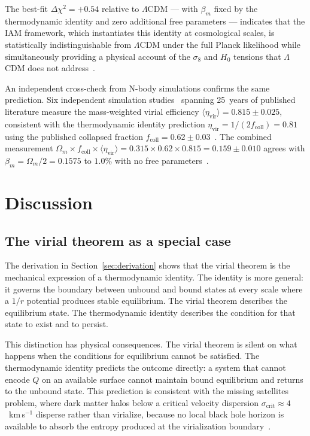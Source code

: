 \documentclass[12pt,a4paper]{article}
\begin{document}
The best-fit $\Delta\chi^2 = +0.54$ relative to $\Lambda$CDM --- with
$\beta_m$ fixed by the thermodynamic identity and zero additional free
parameters --- indicates that the IAM framework, which instantiates this
identity at cosmological scales, is statistically indistinguishable from
$\Lambda$CDM under the full Planck likelihood while simultaneously
providing a physical account of the $\sigma_8$ and $H_0$ tensions that
$\Lambda$CDM does not address~\citep{IAM_obs}.

An independent cross-check from N-body simulations confirms the same
prediction. Six independent simulation
studies~\citep{BryanNorman1998,Bett2007,Neto2007,Ludlow2010,Power2012,Klypin2016}
spanning 25~years of published literature measure the mass-weighted virial
efficiency $\langle\eta_\mathrm{vir}\rangle = 0.815 \pm 0.025$, consistent
with the thermodynamic identity prediction $\eta_\mathrm{vir} =
1/(2f_\mathrm{coll}) = 0.81$ using the published collapsed fraction
$f_\mathrm{coll} = 0.62 \pm 0.03$~\citep{Tinker2008}. The combined
measurement $\Omega_m \times f_\mathrm{coll} \times
\langle\eta_\mathrm{vir}\rangle = 0.315 \times 0.62 \times 0.815 = 0.159
\pm 0.010$ agrees with $\beta_m = \Omega_m/2 = 0.1575$ to $1.0\%$ with
no free parameters~\citep{IAM_virial_eff}.

\section{Discussion}
\label{sec:discussion}

\subsection{The virial theorem as a special case}

The derivation in Section~\ref{sec:derivation} shows that the virial
theorem is the mechanical expression of a thermodynamic identity. The
identity is more general: it governs the boundary between unbound and bound
states at every scale where a $1/r$ potential produces stable equilibrium.
The virial theorem describes the equilibrium state. The thermodynamic
identity describes the condition for that state to exist and to persist.

This distinction has physical consequences. The virial theorem is silent on
what happens when the conditions for equilibrium cannot be satisfied. The
thermodynamic identity predicts the outcome directly: a system that cannot
encode $Q$ on an available surface cannot maintain bound equilibrium and
returns to the unbound state. This prediction is consistent with the
missing satellites problem, where dark matter halos below a critical
velocity dispersion $\sigma_\mathrm{crit} \approx 4$~km\,s$^{-1}$ disperse
rather than virialize, because no local black hole horizon is available to
absorb the entropy produced at the virialization
boundary~\citep{IAM_satellites}.
\end{document}
